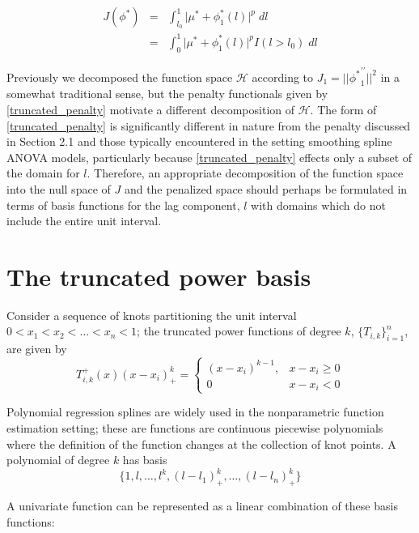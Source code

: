 \documentclass[12pt]{article}
\theoremstyle{definition}
\begin{document}
\begin{eqnarray} \nonumber
J\left(\phi^*\right) &=& \int_{l_0}^1 \vert \mu^* + \phi^*_1\left(l\right) \vert^p\; dl\\
&=& \int_{0}^1 \vert \mu^* + \phi^*_1\left(l\right) \vert^p I\left(l > l_0\right) \; dl \label{truncated_penalty}
\end{eqnarray}

Previously we decomposed the function space $\mathcal{H}$ according to $J_1 = \vert \vert {\phi^*}^{\prime\prime}_1 \vert \vert^2$ in a somewhat traditional sense, but the penalty functionals given by \eqref{truncated_penalty} motivate a different decomposition of $\mathcal{H}$. The form of \eqref{truncated_penalty} is significantly different in nature from the penalty discussed in Section 2.1 and those typically encountered in the setting smoothing spline ANOVA models, particularly because \eqref{truncated_penalty} effects only a subset of the domain for $l$. Therefore, an appropriate decomposition of the function space into the null space of $J$ and the penalized space should perhaps be formulated in terms of basis functions for the lag component, $l$ with domains which do not include the entire unit interval.

\section{The truncated power basis}
Consider a sequence of knots partitioning the unit interval $0 < x_1 < x_2 < \dots <x_n < 1$; the truncated power functions of degree $k$, $\lbrace T_{i,k} \rbrace_{i=1}^n$, are given by
\[
T^+_{i,k}\left(x\right) \left(x - x_i\right)^{k}_+ = \left\{\begin{array}{lr} \left(x-x_i\right)^{k-1}, & x-x_i \ge0\\ 0 & x-x_i < 0\end{array}\right.
\]

Polynomial regression splines are widely used in the nonparametric function estimation setting; these are functions are continuous piecewise polynomials where the definition of the function changes at the collection of knot points. A polynomial of degree $k$ has basis
\[
\lbrace 1,l,\dots,l^k, \left(l - l_1\right)^{k}_+,\dots, \left(l - l_n\right)^{k}_+ \rbrace
\]

A univariate function can be represented as a linear combination of these basis functions: 
\end{document}
